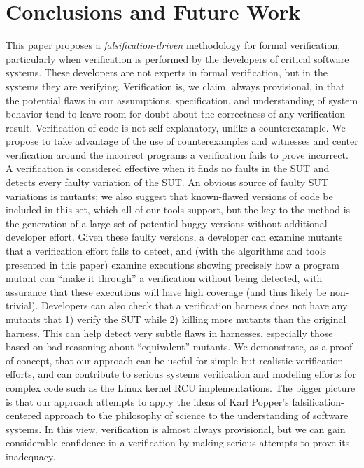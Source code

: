 \documentclass[conference]{IEEEtran}
\begin{document}

\section{Conclusions and Future Work}

This paper proposes a \emph{falsification-driven} methodology for
formal verification, particularly when verification is performed by
the developers of critical software systems.  These developers are not
experts in formal verification, but in the systems they are verifying.
Verification is, we claim, always provisional, in that the potential
flaws in our assumptions, specification, and understanding of system
behavior tend to leave room for doubt about the correctness of any
verification result.  Verification of code is not self-explanatory,
unlike a counterexample.  We propose to take advantage of the use of
counterexamples and witnesses and center verification around the
incorrect programs a verification fails to prove incorrect.  A
verification is considered effective when it finds no faults in the
SUT and detects every faulty variation of the SUT.  An
obvious source of faulty SUT variations is mutants; we also suggest that
known-flawed versions of code be included in this set, which all of
our tools support, but the key to the method is the generation of a
large set of potential buggy versions without additional developer effort.  Given
these faulty versions, a developer can examine mutants that a verification
effort fails to detect, and (with the algorithms and tools presented
in this paper) examine executions showing precisely how a program
mutant can ``make it through'' a verification without being detected,
with assurance that these executions will have high coverage (and thus
likely be non-trivial).  Developers can also check that a verification
harness does not have any mutants that 1) verify the SUT while 2) killing
more mutants than the original harness.  This can help detect
very subtle flaws in harnesses, especially those based on bad
reasoning about ``equivalent'' mutants.  We demonstrate, as a
proof-of-concept, that our approach can be useful for simple but
realistic verification efforts, and can contribute to serious systems
verification and modeling efforts for complex code such as the Linux
kernel RCU implementations.  The bigger picture is that our approach
attempts to apply the ideas of Karl Popper's falsification-centered
approach to the philosophy of science to the understanding of software
systems.  In this view, verification is almost always provisional, but we can 
gain considerable confidence in a verification by making serious attempts to prove its inadequacy.
\end{document}
